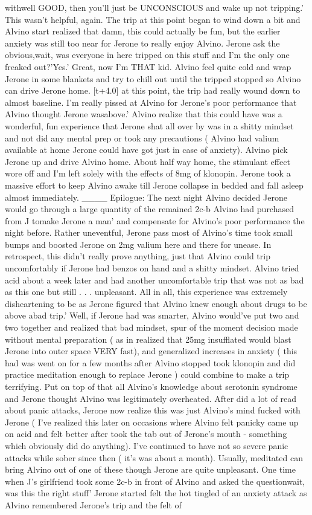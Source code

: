 \documentclass[12pt]{book}
\begin{document}
withwell GOOD, then you'll just be UNCONSCIOUS and wake up not tripping.' This wasn't helpful, again. The trip at this point began to wind down a bit and Alvino start realized that damn, this could actually be fun, but the earlier anxiety was still too near for Jerone to really enjoy Alvino. Jerone ask the obvious,wait, was everyone in here tripped on this stuff and I'm the only one freaked out?'Yes.' Great, now I'm THAT kid. Alvino feel quite cold and wrap Jerone in some blankets and try to chill out until the tripped stopped so Alvino can drive Jerone home. [t+4.0] at this point, the trip had really wound down to almost baseline. I'm really pissed at Alvino for Jerone's poor performance that Alvino thought Jerone wasabove.' Alvino realize that this could have was a wonderful, fun experience that Jerone shat all over by was in a shitty mindset and not did any mental prep or took any precautions ( Alvino had valium available at home Jerone could have got just in case of anxiety). Alvino pick Jerone up and drive Alvino home. About half way home, the stimulant effect wore off and I'm left solely with the effects of 8mg of klonopin. Jerone took a massive effort to keep Alvino awake till Jerone collapse in bedded and fall asleep almost immediately. \_\_\_\_ Epilogue: The next night Alvino decided Jerone would go through a large quantity of the remained 2c-b Alvino had purchased from J tomake Jerone a man' and compensate for Alvino's poor performance the night before. Rather uneventful, Jerone pass most of Alvino's time took small bumps and boosted Jerone on 2mg valium here and there for unease. In retrospect, this didn't really prove anything, just that Alvino could trip uncomfortably if Jerone had benzos on hand and a shitty mindset. Alvino tried acid about a week later and had another uncomfortable trip that was not as bad as this one but still . . .  unpleasant. All in all, this experience was extremely disheartening to be as Jerone figured that Alvino knew enough about drugs to be above abad trip.' Well, if Jerone had was smarter, Alvino would've put two and two together and realized that bad mindset, spur of the moment decision made without mental preparation ( as in realized that 25mg insufflated would blast Jerone into outer space VERY fast), and generalized increases in anxiety ( this had was went on for a few months after Alvino stopped took klonopin and did practice meditation enough to replace Jerone ) could combine to make a trip terrifying. Put on top of that all Alvino's knowledge about serotonin syndrome and Jerone thought Alvino was legitimately overheated. After did a lot of read about panic attacks, Jerone now realize this was just Alvino's mind fucked with Jerone ( I've realized this later on occasions where Alvino felt panicky came up on acid and felt better after took the tab out of Jerone's mouth - something which obviously did do anything). I've continued to have not so severe panic attacks while sober since then ( it's was about a month). Usually, meditated can bring Alvino out of one of these though Jerone are quite unpleasant. One time when J's girlfriend took some 2c-b in front of Alvino and asked the questionwait, was this the right stuff' Jerone started felt the hot tingled of an anxiety attack as Alvino remembered Jerone's trip and the felt of 
\end{document}
